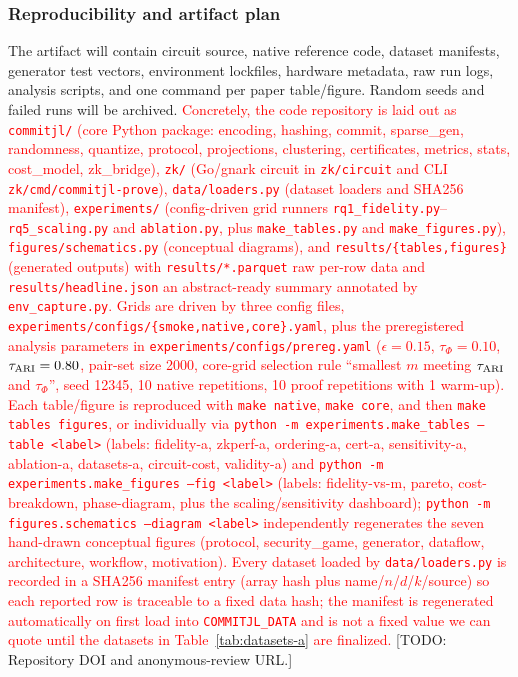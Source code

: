 \documentclass[pdflatex,sn-mathphys-num,iicol]{sn-jnl}
\newcommand{\placeholder}[1]{\textcolor{red!75!black}{[TODO:\allowbreak{} #1]}}
\newcommand{\newtext}[1]{\textcolor{red}{#1}}
\newcommand{\tpexplain}[1]{}
\theoremstyle{plain}
\theoremstyle{definition}
\theoremstyle{remark}
\begin{document}
\subsubsection{Reproducibility and artifact plan}
\tpexplain{List the exact artifacts required to reproduce every table and figure.}
The artifact will contain circuit source, native reference code, dataset manifests, generator test vectors, environment lockfiles, hardware metadata, raw run logs, analysis scripts, and one command per paper table/figure. Random seeds and failed runs will be archived. \newtext{Concretely, the code repository is laid out as \texttt{commitjl/} (core Python package: encoding, hashing, commit, sparse\_gen, randomness, quantize, protocol, projections, clustering, certificates, metrics, stats, cost\_model, zk\_bridge), \texttt{zk/} (Go/gnark circuit in \texttt{zk/circuit} and CLI \texttt{zk/cmd/commitjl-prove}), \texttt{data/loaders.py} (dataset loaders and SHA256 manifest), \texttt{experiments/} (config-driven grid runners \texttt{rq1\_fidelity.py}--\texttt{rq5\_scaling.py} and \texttt{ablation.py}, plus \texttt{make\_tables.py} and \texttt{make\_figures.py}), \texttt{figures/schematics.py} (conceptual diagrams), and \texttt{results/\{tables,figures\}} (generated outputs) with \texttt{results/*.parquet} raw per-row data and \texttt{results/headline.json} an abstract-ready summary annotated by \texttt{env\_capture.py}. Grids are driven by three config files, \texttt{experiments/configs/\{smoke,native,core\}.yaml}, plus the preregistered analysis parameters in \texttt{experiments/configs/prereg.yaml} ($\epsilon=0.15$, $\tau_\Phi=0.10$, $\tau_{\rm ARI}=0.80$, pair-set size 2000, core-grid selection rule ``smallest $m$ meeting $\tau_{\rm ARI}$ and $\tau_\Phi$'', seed 12345, 10 native repetitions, 10 proof repetitions with 1 warm-up). Each table/figure is reproduced with \texttt{make native}, \texttt{make core}, and then \texttt{make tables figures}, or individually via \texttt{python -m experiments.make\_tables --table <label>} (labels: fidelity-a, zkperf-a, ordering-a, cert-a, sensitivity-a, ablation-a, datasets-a, circuit-cost, validity-a) and \texttt{python -m experiments.make\_figures --fig <label>} (labels: fidelity-vs-m, pareto, cost-breakdown, phase-diagram, plus the scaling/sensitivity dashboard); \texttt{python -m figures.schematics --diagram <label>} independently regenerates the seven hand-drawn conceptual figures (protocol, security\_game, generator, dataflow, architecture, workflow, motivation). Every dataset loaded by \texttt{data/loaders.py} is recorded in a SHA256 manifest entry (array hash plus name/$n$/$d$/$k$/source) so each reported row is traceable to a fixed data hash; the manifest is regenerated automatically on first load into \texttt{COMMITJL\_DATA} and is not a fixed value we can quote until the datasets in Table~\ref{tab:datasets-a} are finalized.} \placeholder{Repository DOI and anonymous-review URL.}
\end{document}
